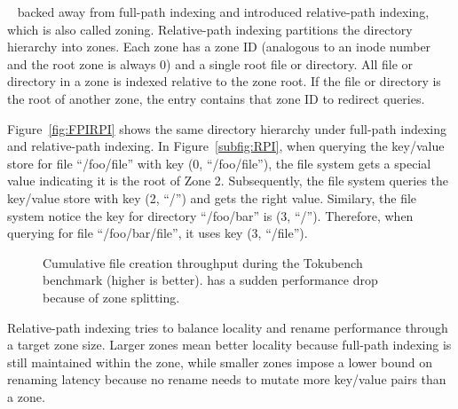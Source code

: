 \betrfsTwo~\citep{betrfs2,betrfs2tos} backed away from full-path indexing and
introduced relative-path indexing, which is also called zoning.
Relative-path indexing partitions the directory hierarchy into zones.
Each zone has a zone ID (analogous to an inode number and the root zone is
always 0) and a single root file or directory.
All file or directory in a zone is indexed relative to the zone root.
If the file or directory is the root of another zone, the entry contains that
zone ID to redirect queries.

Figure~\ref{fig:FPIRPI} shows the same directory hierarchy under full-path
indexing and relative-path indexing.
In Figure~\ref{subfig:RPI}, when querying the key/value store for file
``/foo/file'' with key (0, ``/foo/file''), the file system gets a special value
indicating it is the root of Zone 2.
Subsequently, the file system queries the key/value store with key (2, ``/'')
and gets the right value.
Similary, the file system notice the key for directory ``/foo/bar'' is
(3, ``/'').
Therefore, when querying for file ``/foo/bar/file'', it uses key (3, ``/file'').

\begin{figure}[t]
    \centering
    \caption[Zone maintainance cost in TokuBench]{Cumulative file creation
        throughput during the Tokubench benchmark (higher is better).
        \betrfsThree has a sudden performance drop because of zone splitting.}
    \label{fig:tokuzone}
\end{figure}

Relative-path indexing tries to balance locality and rename performance through
a target zone size.
Larger zones mean better locality because full-path indexing is still maintained
within the zone, while smaller zones impose a lower bound on renaming latency
because no rename needs to mutate more key/value pairs than a zone.

